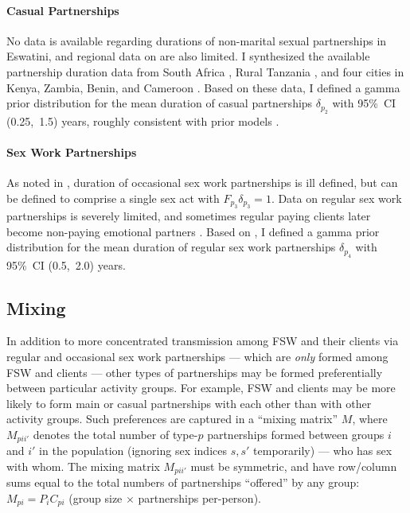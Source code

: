 \paragraph{Casual Partnerships}
No data is available regarding durations of non-marital sexual partnerships in Eswatini,
and regional data on are also limited.
I synthesized the available partnership duration data from
South Africa \cite{Harrison2008,Hargreaves2009,Nguyen2015},
Rural Tanzania \cite{Nnko2004},
and four cities in Kenya, Zambia, Benin, and Cameroon \cite{Ferry2001}.
Based on these data, I defined a gamma prior distribution for
the mean duration of casual partnerships $\delta_{p_{2}}$ with 95\%~CI (0.25,~1.5) years,
roughly consistent with prior models \cite{Johnson2009}.
\paragraph{Sex Work Partnerships}
As noted in , duration of occasional sex work partnerships
is ill defined, but can be defined to comprise a single sex act with $F_{p_{3}}\delta_{p_{3}} = 1$.
Data on regular sex work partnerships is severely limited, and
sometimes regular paying clients later become
non-paying emotional partners \cite{Voeten2007,Mbonye2022}.
Based on \cite{Voeten2002}, I defined a gamma prior distribution for
the mean duration of regular sex work partnerships $\delta_{p_{4}}$ with 95\%~CI (0.5,~2.0) years.
\subsection{Mixing}\label{model.par.mix}
In addition to more concentrated transmission
among FSW and their clients via regular and occasional sex work partnerships
--- which are \emph{only} formed among FSW and clients ---
other types of partnerships may be formed
preferentially between particular activity groups.
For example, FSW and clients may be more likely to form main or casual partnerships
with each other than with other activity groups.
Such preferences are captured in a ``mixing matrix'' $M$, where $M_{pii'}$ denotes
the total number of type-$p$ partnerships formed between groups $i$ and $i'$ in the population
(ignoring sex indices $s,s'$ temporarily)
--- \ie who has sex with whom.
The mixing matrix $M_{pii'}$ must be symmetric,
and have row/column sums equal to the total numbers of partnerships ``offered'' by any group:
$M_{pi} = P_{i} C_{pi}$ (group size $\times$ partnerships per-person).
